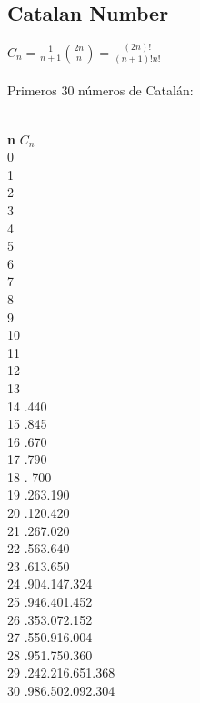 \documentclass[11pt,letterpaper,twocolumn,twosided]{article}
\begin{document}
\subsection{Catalan Number}

{\LARGE $C_{n} = \frac{1}{n+1}\binom{2n}{n} = \frac{(2n)!}{(n+1)!n!}$}
\\ \\
Primeros 30 n\'umeros de Catal\'an:
\\ \\
\begin{tabbing}
\textbf{n}\hspace{3cm} \=  \textbf{$C_{n}$}\hspace{4cm}  \\ 
0  \\ 
1  \\ 
2  \\ 
3  \\ 
4  \\ 
5  \\ 
6  \\ 
7  \\ 
8 \\ 
9 \\ 
10 \\ 
11 \\
12 \\
13 \\ 
14 .440\\ 
15 .845\\ 
16 .670\\
17 .790\\
18 . 700\\
19 .263.190\\
20 .120.420\\ 
21 .267.020\\
22 .563.640\\ 
23 .613.650\\ 
24 .904.147.324\\
25 .946.401.452\\ 
26 .353.072.152\\ 
27 .550.916.004\\ 
28 .951.750.360\\ 
29 .242.216.651.368\\
30 .986.502.092.304\\ 
\end{tabbing}
\end{document}
